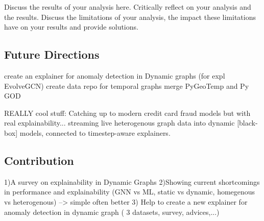 Discuss the results of your analysis here. Critically reflect on your analysis and the results. Discuss the limitations of your analysis, the impact these limitations have on your results and provide solutions.



\subsection{Future Directions}
create an explainer for anomaly detection in Dynamic graphs (for expl EvolveGCN)
create data repo for temporal graphs
merge PyGeoTemp and Py GOD

REALLY cool stuff: Catching up to modern credit card fraud models but with real explainability... streaming live heterogenous graph data into dynamic [black-box] models, connected to timestep-aware explainers.

\subsection{Contribution}
1)A survey on explainability in Dynamic Graphs
2)Showing current shortcomings in performance and explainability (GNN vs ML, static vs dynamic, homegenous vs heterogenous) --> simple often better
3) Help to create a new explainer for anomaly detection in dynamic graph ( 3 datasets, survey, advices,...)